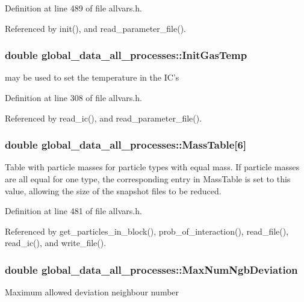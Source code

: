 Definition at line 489 of file allvars.h.



Referenced by init(), and read\_\-parameter\_\-file().

\hypertarget{structglobal__data__all__processes_a633fbd557554f7932dab2641d15e6ea1}{
\subsubsection[{InitGasTemp}]{\setlength{\rightskip}{0pt plus 5cm}double {\bf global\_\-data\_\-all\_\-processes::InitGasTemp}}}
\label{structglobal__data__all__processes_a633fbd557554f7932dab2641d15e6ea1}
may be used to set the temperature in the IC's 

Definition at line 308 of file allvars.h.



Referenced by read\_\-ic(), and read\_\-parameter\_\-file().

\hypertarget{structglobal__data__all__processes_a0d1dbe97a03958559781d9619f8b17c1}{
\subsubsection[{MassTable}]{\setlength{\rightskip}{0pt plus 5cm}double {\bf global\_\-data\_\-all\_\-processes::MassTable}\mbox{[}6\mbox{]}}}
\label{structglobal__data__all__processes_a0d1dbe97a03958559781d9619f8b17c1}
Table with particle masses for particle types with equal mass. If particle masses are all equal for one type, the corresponding entry in MassTable is set to this value, allowing the size of the snapshot files to be reduced. 

Definition at line 481 of file allvars.h.



Referenced by get\_\-particles\_\-in\_\-block(), prob\_\-of\_\-interaction(), read\_\-file(), read\_\-ic(), and write\_\-file().

\hypertarget{structglobal__data__all__processes_a388690a6ee1497eea2f19e3984afa088}{
\subsubsection[{MaxNumNgbDeviation}]{\setlength{\rightskip}{0pt plus 5cm}double {\bf global\_\-data\_\-all\_\-processes::MaxNumNgbDeviation}}}
\label{structglobal__data__all__processes_a388690a6ee1497eea2f19e3984afa088}
Maximum allowed deviation neighbour number 

